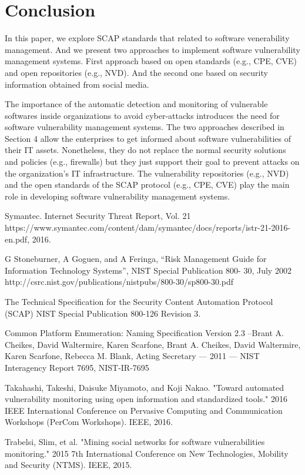 \documentclass{llncs}
\begin{document}
\section{Conclusion}
In this paper, we explore SCAP standards that related to software venerability management. And we present two approaches to implement software vulnerability management systems. First approach based on open standards (e.g., CPE, CVE) and open repositories (e.g., NVD). And the second one based on  security information obtained from social media.  
\par The importance of the automatic detection and monitoring of vulnerable softwares inside organizations to avoid cyber-attacks introduces the need for software vulnerability management systems. The two approaches described in Section 4 allow the enterprises to get informed about software vulnerabilities of their IT assets. Nonetheless, they do not replace the normal security solutions and policies (e.g., firewalls) but they just support their goal to prevent attacks on the organization's IT infrastructure. The vulnerability repositories (e.g., NVD) and the open standards of the SCAP protocol (e.g., CPE, CVE) play the main role in developing software vulnerability management systems.   



\begin{thebibliography}{[MT1]}

%


Symantec. Internet Security Threat Report, Vol. 21 https://www.symantec.com/content/dam/symantec/docs/reports/istr-21-2016-en.pdf, 2016.

G Stoneburner, A Goguen, and A Feringa, “Risk Management Guide
for Information Technology Systems”, NIST Special Publication 800-
30, July 2002
http://csrc.nist.gov/publications/nistpubs/800-30/sp800-30.pdf

The Technical Specification for the
Security Content Automation Protocol (SCAP)
NIST Special Publication 800-126
Revision 3.

Common Platform Enumeration: Naming Specification Version 2.3 –Brant A. Cheikes, David Waltermire, Karen Scarfone, Brant A. Cheikes, David Waltermire, Karen Scarfone, Rebecca M. Blank, Acting Secretary — 2011 — NIST Interagency Report 7695, NIST-IR-7695

Takahashi, Takeshi, Daisuke Miyamoto, and Koji Nakao. "Toward automated vulnerability monitoring using open information and standardized tools." 2016 IEEE International Conference on Pervasive Computing and Communication Workshops (PerCom Workshops). IEEE, 2016.

Trabelsi, Slim, et al. "Mining social networks for software vulnerabilities monitoring." 2015 7th International Conference on New Technologies, Mobility and Security (NTMS). IEEE, 2015.
%
\end{thebibliography}
\end{document}
